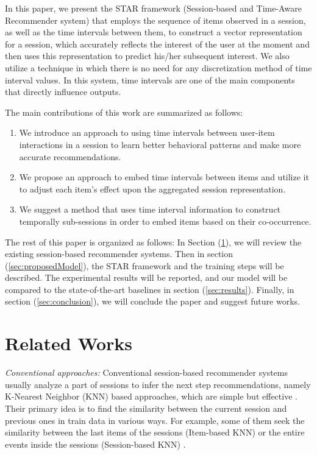 \documentclass[3p, preprint, times]{elsarticle}
\begin{document}
In this paper, we present the STAR framework (Session-based and Time-Aware Recommender system) that employs the sequence of items observed in a session, as well as the time intervals between them, to construct a vector representation for a session, which accurately reflects the interest of the user at the moment and then uses this representation to predict his/her subsequent interest. We also utilize a technique in which there is no need for any discretization method of time interval values. In this system, time intervals are one of the main components that directly influence outputs. 

The main contributions of this work are summarized as follows:

\begin{enumerate}
    \item We introduce an approach to using time intervals between user-item interactions in a session to learn better behavioral patterns and make more accurate recommendations.

	\item We propose an approach to embed time intervals between items and utilize it to adjust each item's effect upon the aggregated session representation. 
	
	\item We suggest a method that uses time interval information to construct temporally sub-sessions in order to embed items based on their co-occurrence.
	
\end{enumerate}

The rest of this paper is organized as follows: In Section (\ref{sec:background}), we will review the existing session-based recommender systems. Then in section (\ref{sec:proposedModel}), the STAR framework and the training steps will be described. The experimental results will be reported, and our model will be compared to the state-of-the-art baselines in section (\ref{sec:results}). Finally, in section (\ref{sec:conclusion}), we will conclude the paper and suggest future works.

\section{Related Works}
\label{sec:background}

\textit{Conventional approaches:} Conventional session-based recommender systems usually analyze a part of sessions to infer the next step recommendations, namely K-Nearest Neighbor (KNN) based approaches, which are simple but effective \cite{ludewig2018evaluation}. Their primary idea is to find the similarity between the current session and previous ones in train data in various ways. For example, some of them seek the similarity between the last items of the sessions (Item-based KNN) \cite{hidasi2016session} or the entire events inside the sessions (Session-based KNN) \cite{jannach2017recurrent}.
\end{document}
